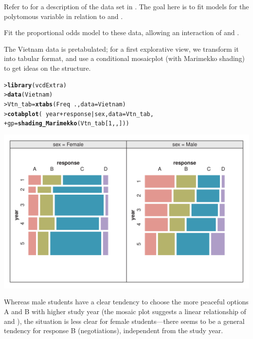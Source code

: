\documentclass[10pt]{report}\usepackage[]{graphicx}\usepackage[]{color}
\makeatletter
\newcommand{\hlnum}[1]{\textcolor[rgb]{0.686,0.059,0.569}{#1}}%
\newcommand{\hlopt}[1]{\textcolor[rgb]{0,0,0}{#1}}%
\newcommand{\hlstd}[1]{\textcolor[rgb]{0.345,0.345,0.345}{#1}}%
\newcommand{\hlkwb}[1]{\textcolor[rgb]{0.69,0.353,0.396}{#1}}%
\newcommand{\hlkwc}[1]{\textcolor[rgb]{0.333,0.667,0.333}{#1}}%
\newcommand{\hlkwd}[1]{\textcolor[rgb]{0.737,0.353,0.396}{\textbf{#1}}}%
\newenvironment{kframe}{%
 \def\at@end@of@kframe{}%
 \ifinner\ifhmode%
  \def\at@end@of@kframe{\end{minipage}}%
  \begin{minipage}{\columnwidth}%
 \fi\fi%
 \def\FrameCommand##1{\hskip\@totalleftmargin \hskip-\fboxsep
 \colorbox{shadecolor}{##1}\hskip-\fboxsep
     \hskip-\linewidth \hskip-\@totalleftmargin \hskip\columnwidth}%
 \MakeFramed {\advance\hsize-\width
   \@totalleftmargin\z@ \linewidth\hsize
   \@setminipage}}%
 {\par\unskip\endMakeFramed%
 \at@end@of@kframe}
\newenvironment{knitrout}{}{} %
\renewenvironment{knitrout}{\small\renewcommand{\baselinestretch}{.85}}{} %
\makeatother
\begin{document}
\begin{Exercises}
\begin{enumerate*}
  \end{enumerate*}

\exercise\exhard\label{lab:logist-vietnam} Refer to  for a description of the  data set
  in . The goal here is to fit models for the polytomous  variable in relation to 
  and .
  \begin{enumerate*}
    \item  Fit the proportional odds model to these data, allowing an interaction of  and .
    \begin{ans}
      The Vietnam data is pretabulated; for a first explorative view,
      we transform it into tabular format, and use a conditional
      mosaicplot (with Marimekko shading) to get ideas on the structure.
\begin{knitrout}\footnotesize
{}\color{fgcolor}\begin{kframe}
\begin{alltt}
\hlstd{> }\hlkwd{library}\hlstd{(vcdExtra)}
\hlstd{> }\hlkwd{data}\hlstd{(Vietnam)}
\hlstd{> }\hlstd{Vtn_tab} \hlkwb{=} \hlkwd{xtabs}\hlstd{(Freq} \hlopt{~} \hlstd{.,} \hlkwc{data} \hlstd{= Vietnam)}
\hlstd{> }\hlkwd{cotabplot}\hlstd{(} \hlopt{~} \hlstd{year} \hlopt{+} \hlstd{response} \hlopt{|} \hlstd{sex,} \hlkwc{data} \hlstd{= Vtn_tab,}
\hlstd{+ }          \hlkwc{gp} \hlstd{=} \hlkwd{shading_Marimekko}\hlstd{(Vtn_tab[}\hlnum{1}\hlstd{,,]))}
\end{alltt}
\end{kframe}

\centerline{\includegraphics[width=.8\textwidth]{soln/fig/ex8_4a1-1} }



\end{knitrout}
      Whereas male students have a clear tendency to choose the more peaceful
      options A and B with higher study year (the mosaic plot suggests a
      linear relationship of  and ), 
      the situation is less clear for
      female students---there seems to be a general tendency for
      response B (negotiations), independent from the study year.
      

\end{ans}
\end{enumerate*}
\end{Exercises}
\end{document}

